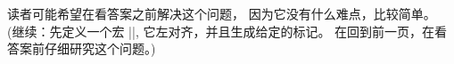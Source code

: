 \ddanger \1读者可能希望在看答案之前解决这个问题，
因为它没有什么难点，比较简单。%
(继续：先定义一个宏 |\beginindex|, 它左对齐，并且生成给定的标记。%
在回到前一页，在看答案前仔细研究这个问题。)
\begintt
\def\beginindex{\begingroup
  \parindent=1em \maxdepth=\maxdimen
  \def\par{\endgraf \futurelet\next\inxentry}
  \obeylines \everypar={\hangindent 2\parindent}
  \exhyphenpenalty=10000 \raggedright}
